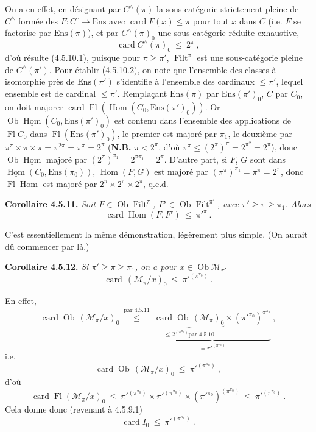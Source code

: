 \documentclass[11pt]{article}
\newcommand{\printedpage}[1]{\marginpar{\footnotesize p.~#1}}
\newcommand{\msp}[1]{\marginpar{\footnotesize [#1]}}
\newcommand{\Filt}{\operatorname{Filt}}
\newcommand{\Ob}{\operatorname{Ob}}
\newcommand{\card}{\operatorname{card}}
\newcommand{\Fl}{\operatorname{Fl}}
\newcommand{\Hom}{\operatorname{Hom}}
\newcommand{\uHom}{\underline{\operatorname{Hom}}}
\newcommand{\Ens}{\mathrm{Ens}}
\begin{document}
On a en effet, en désignant par $C^\wedge(\pi)$ la sous-catégorie strictement pleine de $C^\wedge$ formée des $F : C^\circ \longrightarrow \Ens$ avec $\card F(x) \leqslant \pi$ pour tout $x$ dans $C$ (i.e. $F$ se factorise par $\Ens(\pi)$), et par $C^\wedge(\pi)_0$ une
\printedpage{37}
\msp{page 123}
sous-catégorie réduite exhaustive,
\[
\card C^\wedge(\pi)_0 \ \leqslant \ 2^\pi \ , \tag*{(4.5.10.2)}
\]
d'où résulte (4.5.10.1), puisque pour $\pi \geqslant \pi'$, $\Filt^\pi$ est une sous-catégorie pleine de $C^\wedge(\pi')$. Pour établir (4.5.10.2), on note que l'ensemble des classes à isomorphie près de $\Ens(\pi')$ s'identifie à l'ensemble des cardinaux $\leqslant \pi'$, lequel ensemble est de cardinal $\leqslant \pi'$. Remplaçant $\Ens(\pi)$ par $\Ens(\pi')_0$, $C$ par $C_0$, on doit majorer $\card \Fl(\uHom(C_0, \Ens(\pi')_0))$. Or $\Ob \uHom(C_0, \Ens(\pi')_0)$ est contenu dans l'ensemble des applications de $\Fl C_0$ dans $\Fl(\Ens(\pi')_0)$, le premier est majoré par $\pi_1$, le deuxième par $\pi^\pi \times \pi \times \pi = \pi^{2\pi} = \pi^\pi = 2^\pi$ (\textbf{N.B.} $\pi < 2^\pi$, d'où $\pi^\pi \leqslant (2^\pi)^\pi = 2^{\pi^2} = 2^\pi$), donc $\Ob \uHom$ majoré par $(2^\pi)^{\pi_1} = 2^{\pi\pi_1} = 2^\pi$. D'autre part, si $F$, $G$ sont dans $\uHom(C_0, \Ens(\pi_0))$, $\Hom(F,G)$ est majoré par $(\pi^\pi)^{\pi_1} = \pi^\pi = 2^\pi$, donc $\Fl \uHom$ est majoré par $2^\pi \times 2^\pi \times 2^\pi$, q.e.d.

\textbf{Corollaire 4.5.11.} \textit{Soit $F \in \Ob \Filt^\pi$, $F' \in \Ob \Filt^{\pi'}$, avec $\pi' \geqslant \pi \geqslant \pi_1$. Alors}
\[
\card \Hom(F, F') \ \leqslant \ \pi'^{\pi} \ . \tag*{(4.5.11.1)}
\]

\msp{page 124}

C'est essentiellement la même démonstration, légèrement plus simple. (On aurait dû commencer par là.)

\textbf{Corollaire 4.5.12.} \textit{Si $\pi' \geqslant \pi \geqslant \pi_1$, on a pour $x \in \Ob \mathcal{M}_{\pi'}$}
\[
\card\,(\mathcal{M}_\pi/x)_0 \ \leqslant \ \pi'^{(\pi^{\pi_0})} \ . \tag*{(4.5.12)}
\]

En effet,
\[
\card \Ob\,(\mathcal{M}_\pi/x)_0 \ \overset{\text{par 4.5.11}}{\leqslant} \ \underbrace{\underbrace{\card \Ob\,(\mathcal{M}_\pi)_0}_{\leqslant 2^{(\pi^{\pi_0})} \text{par 4.5.10}} \times (\pi'^{\pi_0})^{\pi^{\pi_0}}}_{= \pi'^{(\pi^{\pi_0})}} \ ,
\]
i.e.
\[
\card \Ob\,(\mathcal{M}_\pi/x)_0 \ \leqslant \ \pi'^{(\pi^{\pi_0})} \ ,
\]
d'où
\[
\card \Fl(\mathcal{M}_\pi/x)_0 \ \leqslant \ \pi'^{(\pi^{\pi_0})} \times \pi'^{(\pi^{\pi_0})} \times (\pi'^{\pi_0})^{(\pi^{\pi_0})} \ \leqslant \ \pi'^{(\pi^{\pi_0})} \ .
\]
Cela donne donc (revenant à 4.5.9.1)
\[
\card I_0 \ \leqslant \ \pi'^{(\pi^{\pi_0})} \ .
\]
\end{document}
